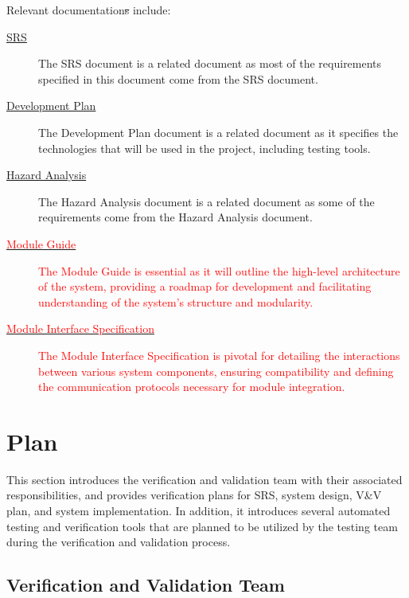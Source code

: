 \documentclass[12pt, titlepage]{article}
\newcommand{\rt}[1]{\textcolor{red}{#1}}
\begin{document}
Relevant documentation\sout{s} include:
\begin{description}
\item[\href{https://github.com/InfiniView-AI/MotionMingle/blob/main/docs/SRS/SRS.pdf}{SRS}]
  The SRS document is a related document as most of the requirements specified
  in this document come from the SRS document.
\item[\href{https://github.com/InfiniView-AI/MotionMingle/blob/main/docs/DevelopmentPlan/DevelopmentPlan.pdf}{Development Plan}]
  The Development Plan document is a related document as it specifies the
  technologies that will be used in the project, including testing tools.
\item[\href{https://github.com/InfiniView-AI/MotionMingle/blob/main/docs/HazardAnalysis/HazardAnalysis.pdf}{Hazard Analysis}]
  The Hazard Analysis document is a related document as some of the requirements
  come from the Hazard Analysis document.
\item[\href{https://github.com/InfiniView-AI/MotionMingle/blob/main/docs/Design/SoftArchitecture/MG.pdf}{\rt{Module Guide}}]
  \rt{The Module Guide is essential as it will outline the high-level architecture of the system, providing a roadmap for development and facilitating understanding of the system's structure and modularity.}
\item[\href{https://github.com/InfiniView-AI/MotionMingle/blob/main/docs/Design/SoftDetailedDes/MIS.pdf}{\rt{Module Interface Specification}}]
  \rt{The Module Interface Specification is pivotal for detailing the interactions between various system components, ensuring compatibility and defining the communication protocols necessary for module integration.}
\end{description}

\section{Plan}

This section introduces the verification and validation team with their
associated responsibilities, and provides verification plans for SRS, system
design, V\&V plan, and system implementation. In addition, it introduces several
automated testing and verification tools that are planned to be utilized by the
testing team during the verification and validation process.

\subsection{Verification and Validation Team}
\end{document}

